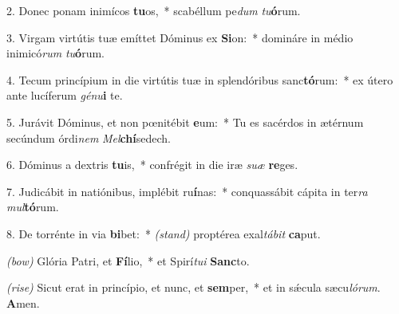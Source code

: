  2. Donec ponam inimícos \textbf{tu}os,~*
	scabéllum pe\textit{dum} \textit{tu}\textbf{ó}rum.
	
3. Virgam virtútis tuæ emíttet Dóminus ex \textbf{Si}on:~*
	domináre in médio inimicó\textit{rum} \textit{tu}\textbf{ó}rum.
	
4. Tecum princípium in die virtútis tuæ in splendóribus sanc\textbf{tó}rum:~*
	ex útero ante lucíferum \textit{gé}\textit{nu}\textbf{i} te.
	
5. Jurávit Dóminus, et non p{\oe}nitébit \textbf{e}um:~*
	Tu es sacérdos in ætérnum secúndum órdi\textit{nem} \textit{Mel}\textbf{chí}se\-dech.
	
6. Dóminus a dextris \textbf{tu}is,~* 
	confrégit in die iræ \textit{su}\textit{æ} \textbf{re}ges.
	
7. Judicábit in natiónibus, implébit ru\textbf{í}nas:~*
	conquassábit cápita in ter\textit{ra} \textit{mul}\textbf{tó}rum.
	
8. De torrénte in via \textbf{bi}bet:~* {\color{red}\textit{(stand)}}
	proptérea exal\textit{tá}\textit{bit} \textbf{ca}put.

{\color{red}\textit{(bow)}} Glória Patri, et \textbf{Fí}lio,~*
	et Spirí\textit{tu}\textit{i} \textbf{Sanc}to.
	
{\color{red}\textit{(rise)}} Sicut erat in princípio, et nunc, et \textbf{sem}per,~*
	et in s\'{\ae}cula sæcu\textit{ló}\textit{rum}. \textbf{A}men.